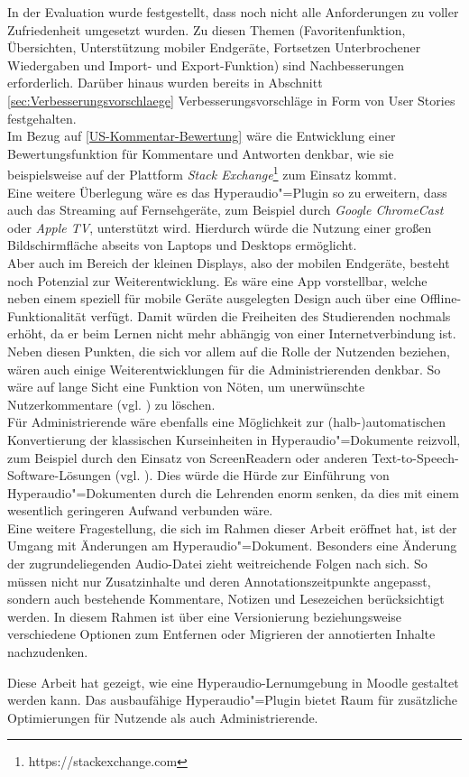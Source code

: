 In der Evaluation wurde festgestellt, dass noch nicht alle Anforderungen zu voller Zufriedenheit umgesetzt wurden. Zu diesen Themen (Favoritenfunktion, Übersichten, Unterstützung mobiler Endgeräte, Fortsetzen Unterbrochener Wiedergaben und Import- und Export-Funktion) sind Nachbesserungen erforderlich. Darüber hinaus wurden bereits in Abschnitt \ref{sec:Verbesserungsvorschlaege} Verbesserungsvorschläge in Form von User Stories festgehalten.\\
Im Bezug auf \ref{US-Kommentar-Bewertung} wäre die Entwicklung einer Bewertungsfunktion für Kommentare und Antworten denkbar, wie sie beispielsweise auf der Plattform \textit{Stack Exchange}\footnote{https://stackexchange.com} zum Einsatz kommt.\\
Eine weitere Überlegung wäre es das Hyperaudio"=Plugin so zu erweitern, dass auch das Streaming auf Fernsehgeräte, zum Beispiel durch \textit{Google ChromeCast} oder \textit{Apple TV}, unterstützt wird. Hierdurch würde die Nutzung einer großen Bildschirmfläche abseits von Laptops und Desktops ermöglicht.\\
Aber auch im Bereich der kleinen Displays, also der mobilen Endgeräte, besteht noch Potenzial zur Weiterentwicklung. Es wäre eine App vorstellbar, welche neben einem speziell für mobile Geräte ausgelegten Design auch über eine Offline-Funktionalität verfügt. Damit würden die Freiheiten des Studierenden nochmals erhöht, da er beim Lernen nicht mehr abhängig von einer Internetverbindung ist.\\
Neben diesen Punkten, die sich vor allem auf die Rolle der Nutzenden beziehen, wären auch einige Weiterentwicklungen für die Administrierenden denkbar. So wäre auf lange Sicht eine Funktion von Nöten, um unerwünschte Nutzerkommentare (vgl. \cite{reinmann2002analyse}) zu löschen.\\
Für Administrierende wäre ebenfalls eine Möglichkeit zur (halb-)automatischen Konvertierung der klassischen Kurseinheiten in Hyperaudio"=Dokumente reizvoll, zum Beispiel durch den Einsatz von ScreenReadern oder anderen Text-to-Speech-Software-Lösungen (vgl. \cite{donker2007gestaltung}). Dies würde die Hürde zur Einführung von Hyperaudio"=Dokumenten durch die Lehrenden enorm senken, da dies mit einem wesentlich geringeren Aufwand verbunden wäre.\\
Eine weitere Fragestellung, die sich im Rahmen dieser Arbeit eröffnet hat, ist der Umgang mit Änderungen am Hyperaudio"=Dokument. Besonders eine Änderung der zugrundeliegenden Audio-Datei zieht weitreichende Folgen nach sich. So müssen nicht nur Zusatzinhalte und deren Annotationszeitpunkte angepasst, sondern auch bestehende Kommentare, Notizen und Lesezeichen berücksichtigt werden. In diesem Rahmen ist über eine Versionierung beziehungsweise verschiedene Optionen zum Entfernen oder Migrieren der annotierten Inhalte nachzudenken.

Diese Arbeit hat gezeigt, wie eine Hyperaudio-Lernumgebung in Moodle gestaltet werden kann. Das ausbaufähige Hyperaudio"=Plugin bietet Raum für zusätzliche Optimierungen für Nutzende als auch Administrierende.